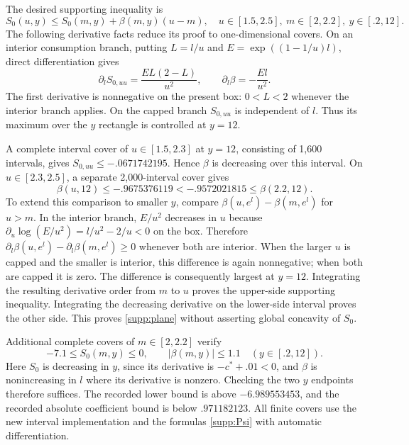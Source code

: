 The desired supporting inequality is
\begin{equation}
 S_0(u,y)\leq S_0(m,y)+\beta(m,y)(u-m),
 \quad u\in[1.5,2.5],\ m\in[2,2.2],\ y\in[.2,12].\label{supp:plane}
\end{equation}
The following derivative facts reduce its proof to one-dimensional covers. On an interior consumption branch, putting $L=l/u$ and $E=\exp((1-1/u)l)$, direct differentiation gives
\[
 \partial_l S_{0,uu}=\frac{E L(2-L)}{u^2},\qquad
 \partial_l\beta=-\frac{E l}{u^2}.
\]
The first derivative is nonnegative on the present box: $0<L<2$ whenever the interior branch applies. On the capped branch $S_{0,uu}$ is independent of $l$. Thus its maximum over the $y$ rectangle is controlled at $y=12$.

A complete interval cover of $u\in[1.5,2.3]$ at $y=12$, consisting of 1,600 intervals, gives $S_{0,uu}\leq-.0671742195$. Hence $\beta$ is decreasing over this interval. On $u\in[2.3,2.5]$, a separate 2,000-interval cover gives
\[
 \beta(u,12)\leq-.9675376119<-.9572021815\leq\beta(2.2,12).
\]
To extend this comparison to smaller $y$, compare $\beta(u,e^l)-\beta(m,e^l)$ for $u>m$. In the interior branch, $E/u^2$ decreases in $u$ because $\partial_u\log(E/u^2)=l/u^2-2/u<0$ on the box. Therefore $\partial_l\beta(u,e^l)-\partial_l\beta(m,e^l)\geq0$ whenever both are interior. When the larger $u$ is capped and the smaller is interior, this difference is again nonnegative; when both are capped it is zero. The difference is consequently largest at $y=12$. Integrating the resulting derivative order from $m$ to $u$ proves the upper-side supporting inequality. Integrating the decreasing derivative on the lower-side interval proves the other side. This proves \eqref{supp:plane} without asserting global concavity of $S_0$.

Additional complete covers of $m\in[2,2.2]$ verify
\begin{equation}
 -7.1\leq S_0(m,y)\leq0,\qquad |\beta(m,y)|\leq1.1
 \quad (y\in[.2,12]).\label{supp:primitive}
\end{equation}
Here $S_0$ is decreasing in $y$, since its derivative is $-c^*+.01<0$, and $\beta$ is nonincreasing in $l$ where its derivative is nonzero. Checking the two $y$ endpoints therefore suffices. The recorded lower bound is above $-6.989553453$, and the recorded absolute coefficient bound is below $.971182123$. All finite covers use the new interval implementation and the formulas \eqref{supp:Psi} with automatic differentiation.

